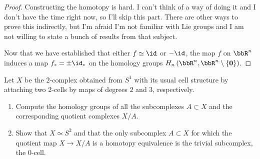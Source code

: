 \begin{proof}
Constructing the homotopy is hard. I can't think of a way of doing it and I
don't have the time right now, so I'll skip this part. There are other ways
to prove this indirectly, but I'm afraid I'm not familiar with Lie groups
and I am not willing to state a bunch of results from that subject.

Now that we have established that either $f\simeq \id$ or $-\id$, the map
$f$ on $\bbR^n$ induces a map $f_*=\pm\id_*$ on the homology groups
$H_n\left(\bbR^n,\bbR^n\setminus\{\mathbf{0}\}\right)$.
\end{proof}
\newpage

\begin{problem}[Hatcher {\S}2.2, Ex.\@ 13]
Let $X$ be the $2$-complex obtained from $S^1$ with its usual cell
structure by attaching two $2$-cells by maps of degrees $2$ and $3$,
respectively.
\begin{enumerate}[label=(\alph*)]
\item Compute the homology groups of all the subcomplexes $A\subset X$ and
  the corresponding quotient complexes $X/A$.
\item Show that $X\simeq S^2$ and that the only subcomplex $A\subset X$ for
  which the quotient map $X\to X/A$ is a homotopy equivalence is the
  trivial subcomplex, the $0$-cell.
\end{enumerate}
\end{problem}
